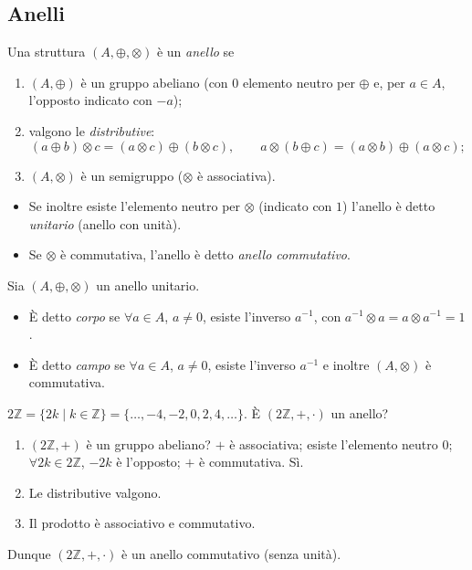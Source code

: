 \documentclass[11pt,a4paper]{article}
\begin{document}
\subsection{Anelli}

\begin{definizione}[Anello]
Una struttura $(A, \oplus, \otimes)$ è un \emph{anello} se
\begin{enumerate}
  \item $(A, \oplus)$ è un gruppo abeliano (con $0$ elemento neutro per $\oplus$ e, per $a \in A$, l'opposto indicato con $-a$);
  \item valgono le \emph{distributive}:
  \[
    (a \oplus b) \otimes c = (a \otimes c) \oplus (b \otimes c), \qquad
    a \otimes (b \oplus c) = (a \otimes b) \oplus (a \otimes c);
  \]
  \item $(A, \otimes)$ è un semigruppo ($\otimes$ è associativa).
\end{enumerate}
\end{definizione}

\begin{itemize}
  \item Se inoltre esiste l'elemento neutro per $\otimes$ (indicato con $1$) l'anello è detto \emph{unitario} (anello con unità).
  \item Se $\otimes$ è commutativa, l'anello è detto \emph{anello commutativo}.
\end{itemize}

\begin{definizione}
Sia $(A, \oplus, \otimes)$ un anello unitario.
\begin{itemize}
  \item È detto \emph{corpo} se $\forall a \in A$, $a \neq 0$, esiste l'inverso $a^{-1}$, con $a^{-1} \otimes a = a \otimes a^{-1} = 1$.
  \item È detto \emph{campo} se $\forall a \in A$, $a \neq 0$, esiste l'inverso $a^{-1}$ e inoltre $(A, \otimes)$ è commutativa.
\end{itemize}
\end{definizione}

\begin{esempio}[$2\mathbb{Z}$]
$2\mathbb{Z} = \{2k \mid k \in \mathbb{Z}\} = \{\dots, -4, -2, 0, 2, 4, \dots\}$. È $(2\mathbb{Z}, +, \cdot)$ un anello?
\begin{enumerate}
  \item $(2\mathbb{Z}, +)$ è un gruppo abeliano? $+$ è associativa; esiste l'elemento neutro $0$; $\forall 2k \in 2\mathbb{Z}$, $-2k$ è l'opposto; $+$ è commutativa. Sì.
  \item Le distributive valgono.
  \item Il prodotto è associativo e commutativo.
\end{enumerate}
Dunque $(2\mathbb{Z}, +, \cdot)$ è un anello commutativo (senza unità).
\end{esempio}
\end{document}
